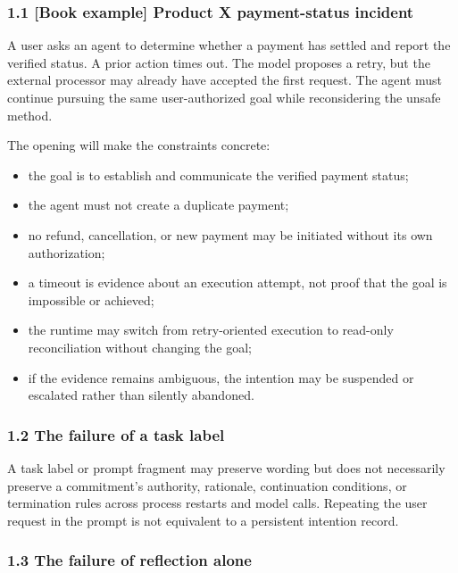 \subsubsection{1.1 {[}Book example{]} Product X payment-status incident}\label{book-example-product-x-payment-status-incident}

A user asks an agent to determine whether a payment has settled and report the verified status. A prior action times out. The model proposes a retry, but the external processor may already have accepted the first request. The agent must continue pursuing the same user-authorized goal while reconsidering the unsafe method.

The opening will make the constraints concrete:

\begin{itemize}
\tightlist
\item
  the goal is to establish and communicate the verified payment status;
\item
  the agent must not create a duplicate payment;
\item
  no refund, cancellation, or new payment may be initiated without its own authorization;
\item
  a timeout is evidence about an execution attempt, not proof that the goal is impossible or achieved;
\item
  the runtime may switch from retry-oriented execution to read-only reconciliation without changing the goal;
\item
  if the evidence remains ambiguous, the intention may be suspended or escalated rather than silently abandoned.
\end{itemize}

\subsubsection{1.2 The failure of a task label}\label{the-failure-of-a-task-label}

A task label or prompt fragment may preserve wording but does not necessarily preserve a commitment's authority, rationale, continuation conditions, or termination rules across process restarts and model calls. Repeating the user request in the prompt is not equivalent to a persistent intention record.

\subsubsection{1.3 The failure of reflection alone}\label{the-failure-of-reflection-alone}

